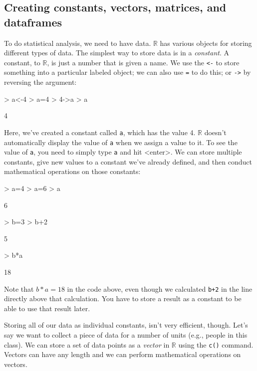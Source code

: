 \documentclass[12pt]{article}
\begin{document}
\subsection{Creating constants, vectors, matrices, and dataframes}
To do statistical analysis, we need to have data. $\mathbb{R}$ has various objects for storing different types of data. The simplest way to store data is in a \emph{constant}. A constant, to $\mathbb{R}$, is just a number that is given a name. We use the \verb|<-| to store something into a particular labeled object; we can also use \verb|=| to do this; or \verb|->| by reversing the argument:
\begin{Schunk}
\begin{Sinput}
> a<-4
> a=4
> 4->a
> a
\end{Sinput}
\begin{Soutput}
[1] 4
\end{Soutput}
\end{Schunk}
Here, we've created a constant called \verb|a|, which has the value 4. $\mathbb{R}$ doesn't automatically display the value of \verb|a| when we assign a value to it. To see the value of \verb|a|, you need to simply type \verb|a| and hit <enter>. We can store multiple constants, give new values to a constant we've already defined, and then conduct mathematical operations on those constants:
\begin{Schunk}
\begin{Sinput}
> a=4
> a=6
> a
\end{Sinput}
\begin{Soutput}
[1] 6
\end{Soutput}
\begin{Sinput}
> b=3
> b+2
\end{Sinput}
\begin{Soutput}
[1] 5
\end{Soutput}
\begin{Sinput}
> b*a
\end{Sinput}
\begin{Soutput}
[1] 18
\end{Soutput}
\end{Schunk}
Note that $b*a=18$ in the code above, even though we calculated \verb|b+2| in the line directly above that calculation. You have to store a result as a constant to be able to use that result later.

Storing all of our data as individual constants, isn't very efficient, though. Let's say we want to collect a piece of data for a number of units (e.g., people in this class). We can store a set of data points as a \emph{vector} in $\mathbb{R}$ using the \verb|c()| command. Vectors can have any length and we can perform mathematical operations on vectors.
\end{document}
